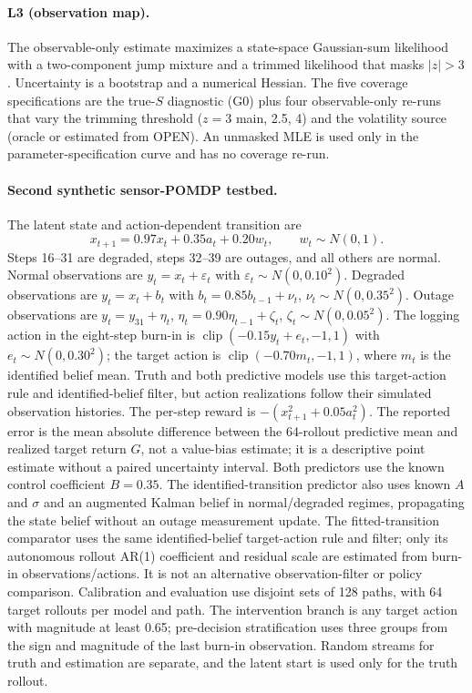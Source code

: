 \paragraph{L3 (observation map).}
The observable-only estimate maximizes a state-space Gaussian-sum likelihood
with a two-component jump mixture and a trimmed likelihood that masks $|z|>3$.
Uncertainty is a bootstrap and a numerical Hessian. The five coverage specifications are the true-$S$ diagnostic (G0) plus four
observable-only re-runs that vary the trimming threshold ($z=3$ main, 2.5, 4)
and the volatility source (oracle or estimated from OPEN). An unmasked MLE is
used only in the parameter-specification curve and has no coverage re-run.

\paragraph{Second synthetic sensor-POMDP testbed.}
The latent state and action-dependent transition are
\[
x_{t+1}=0.97x_t+0.35a_t+0.20w_t,\qquad w_t\sim N(0,1).
\]
Steps 16--31 are degraded, steps 32--39 are outages, and all others are normal.
Normal observations are $y_t=x_t+\varepsilon_t$ with
$\varepsilon_t\sim N(0,0.10^2)$. Degraded observations are $y_t=x_t+b_t$ with
$b_t=0.85b_{t-1}+\nu_t$, $\nu_t\sim N(0,0.35^2)$. Outage observations are
$y_t=y_{31}+\eta_t$, $\eta_t=0.90\eta_{t-1}+\zeta_t$,
$\zeta_t\sim N(0,0.05^2)$. The logging action in the eight-step burn-in is
$\operatorname{clip}(-0.15y_t+e_t,-1,1)$ with $e_t\sim N(0,0.30^2)$; the target
action is $\operatorname{clip}(-0.70m_t,-1,1)$, where $m_t$ is the identified
belief mean. Truth and both predictive models use this target-action rule and
identified-belief filter, but action realizations follow their simulated
observation histories. The per-step reward is
$-(x_{t+1}^2+0.05a_t^2)$. The reported error is the mean absolute difference
between the 64-rollout predictive mean and realized target return $G$, not a
value-bias estimate; it is a descriptive point estimate without a paired
uncertainty interval. Both predictors use the known control coefficient $B=0.35$.
The identified-transition predictor also uses known $A$ and $\sigma$ and an
augmented Kalman belief in normal/degraded regimes, propagating the state belief
without an outage measurement update. The fitted-transition comparator uses the
same identified-belief target-action rule and filter; only its autonomous rollout
AR(1) coefficient and residual scale are estimated from burn-in observations/actions.
It is not an alternative observation-filter
or policy comparison. Calibration and evaluation use disjoint sets of 128 paths,
with 64 target rollouts per model and path. The intervention branch is any target
action with magnitude at least 0.65; pre-decision stratification uses three groups
from the sign and magnitude of the last burn-in observation. Random streams for
truth and estimation are separate, and the latent start is used only for the truth rollout.

